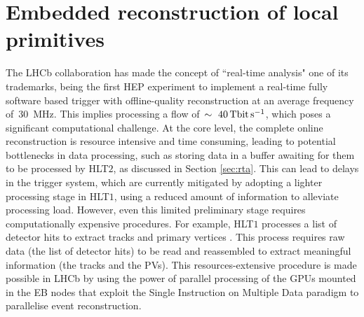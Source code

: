 
\chapter{Embedded reconstruction of local primitives}
\label{chp:retina}

The LHCb collaboration has made the concept of ``real-time analysis" one of its trademarks, being the first HEP experiment to implement a real-time fully software based trigger with offline-quality reconstruction at an average frequency of~\SI{30}{\mega\hertz}. This implies processing a flow of~$\sim~\SI{40}{\tera\bit\per\second}$, which poses a significant computational challenge.
At the core level, the complete online reconstruction is resource intensive and time consuming, leading to potential bottlenecks in data processing, such as storing data in a buffer awaiting for them to be processed by HLT$2$, as discussed in Section \ref{sec:rta}. This can lead to delays in the trigger system, which are currently mitigated by adopting a lighter processing stage in HLT$1$, using a reduced amount of information to alleviate processing load.
However, even this limited preliminary stage requires computationally expensive procedures. For example, HLT$1$ processes a list of detector hits to extract tracks and primary vertices \cite{https://doi.org/10.5281/zenodo.8119731}. This process requires raw data (the list of detector hits) to be read and reassembled to extract meaningful information (the tracks and the PVs). This resources-extensive procedure is made possible in LHCb by using the power of parallel processing of the GPUs mounted in the EB nodes that exploit the Single Instruction on Multiple Data paradigm\cite{5009071} to parallelise event reconstruction. %

